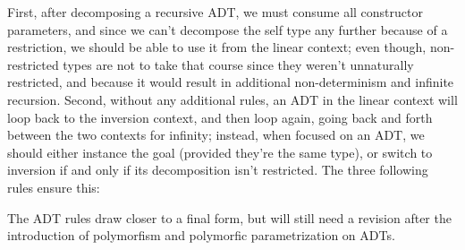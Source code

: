\documentclass{llncs}
\def\Rho{P}
\newcommand{\te}[1]{\textrm{\emph{#1}}}
\begin{document}
First, after decomposing a recursive ADT, we must consume all constructor
parameters, and since we can't decompose the self type any further because of a
restriction, we should be able to use it from the linear context; even though,
non-restricted types are not to take that course since they weren't unnaturally
restricted, and because it would result in additional non-determinism and
infinite recursion. Second, without any additional rules, an ADT in the linear
context will loop back to the inversion context, and then loop again, going back and
forth between the two contexts for infinity; instead, when focused on an ADT, we should
either instance the goal (provided they're the same type), or switch to
inversion if and only if its decomposition isn't restricted. The three
following rules ensure this:
The ADT rules draw closer to a final form, but will still need a revision
after the introduction of polymorfism and polymorfic parametrization on ADTs.
\end{document}
